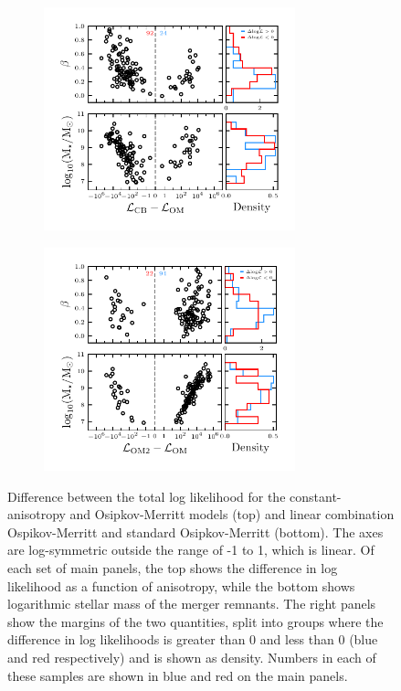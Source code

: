 \begin{figure}
    \centering
    \begin{subfigure}{0.8\textwidth}
        \includegraphics[width=0.8\textwidth]{figure/ch4/loglike_symlog_starmass_beta_comparison_cb_om.pdf}
    \end{subfigure}
    \begin{subfigure}{0.8\textwidth}
        \includegraphics[width=0.8\textwidth]{figure/ch4/loglike_symlog_starmass_beta_comparison_om2_om.pdf}
    \end{subfigure}
    \caption{Difference between the total log likelihood for the constant-anisotropy and Osipkov-Merritt models (top) and linear combination Ospikov-Merritt and standard Osipkov-Merritt (bottom). The axes are log-symmetric outside the range of -1 to 1, which is linear. Of each set of main panels, the top shows the difference in log likelihood as a function of anisotropy, while the bottom shows logarithmic stellar mass of the merger remnants. The right panels show the margins of the two quantities, split into groups where the difference in log likelihoods is greater than 0 and less than 0 (blue and red respectively) and is shown as density. Numbers in each of these samples are shown in blue and red on the main panels.}
    \label{ch4:fig:loglike-diff-beta-starmass}
\end{figure}

